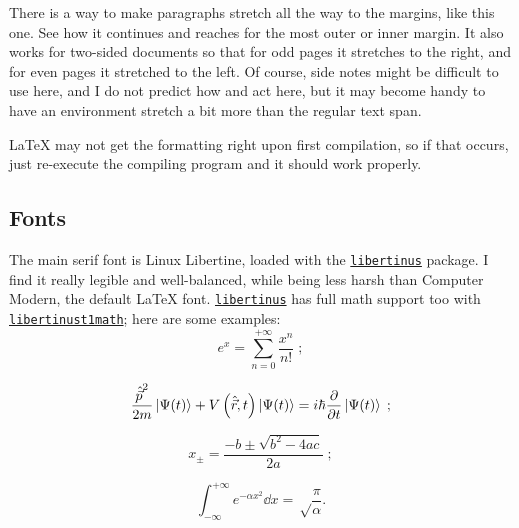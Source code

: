 \documentclass[
	raggedright,
	twoside,
	12pt,
	colorful,
]{tufte-style-article}
\begin{document}
\begin{wide}
\hspace{1em}
There is a way to make paragraphs stretch all the way to the margins, like this one.	See how it continues and reaches for the most outer or inner margin. It also works for two-sided documents so that for odd pages it stretches to the right, and for even pages it stretched to the left. Of course, side notes might be difficult to use here, and I do not predict how  and   act here, but it may become handy to have an environment stretch a bit more than the regular text span.


\LaTeX{} may not get the formatting right upon first compilation, so if that occurs, just re-execute the compiling program and it should work properly.
\end{wide}


\subsection{Fonts}

The main serif font is Linux Libertine, loaded with the \href{www.ctan.org/pkg/libertinus}{\texttt{libertinus}} package. I find it really legible and well-balanced, while being less harsh than Computer Modern, the default \LaTeX{} font. \href{www.ctan.org/pkg/libertinus}{\texttt{libertinus}} has full math support too with \href{www.ctan.org/pkg/libertinust1math}{\texttt{libertinust1math}}; here are some examples:
$$
e^x = \sum_{n=0}^{+\infty} \frac{x^n}{n!} \;;
$$

$$
\frac{{\hat{\vec p}}^2}{2m}\ket{\Psi(t)} + V\left(\hat{\vec r},t\right)\ket{\Psi(t)} = i\hbar \pdv{}{t}\ket{\Psi(t)} \;;
$$

$$
x_\pm = \frac{-b \pm \sqrt{b^2 - 4ac}}{2a}\;;
$$

$$
\int_{-\infty}^{+\infty} e^{-\alpha x^2} \dd{x} = \sqrt\frac{\pi}{\alpha}.
$$
\end{document}
